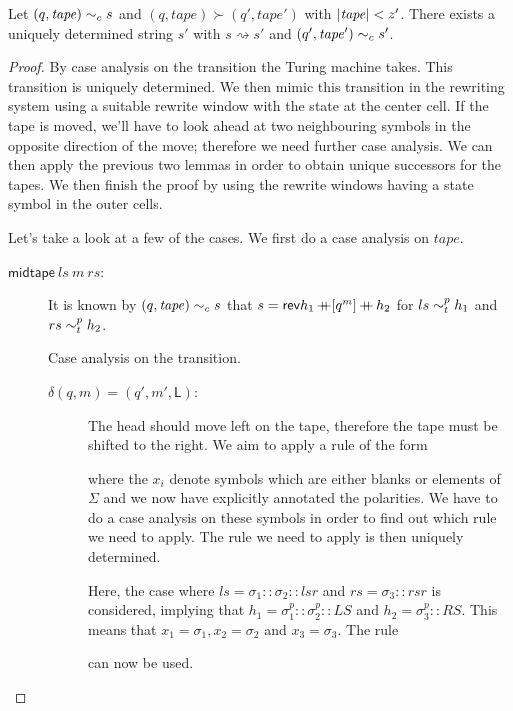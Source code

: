 \documentclass[a4paper,UKenglish,cleveref, autoref]{lipics-v2019}
\newcommand{\strent}{\rightsquigarrow}
\begin{document}
\begin{lemma}
  Let $(q, \mathit{tape}) \sim_c{} s$ and $(q, \mathit{tape}) \succ (q', \mathit{tape}')$ with $|\mathit{tape}| < z'$. There exists a uniquely determined string $s'$ with $s \strent{} s'$ and $(q', \mathit{tape}') \sim_c{} s'$. 
\end{lemma}
\begin{proof}
  By case analysis on the transition the Turing machine takes. This transition is uniquely determined. We then mimic this transition in the rewriting system using a suitable rewrite window with the state at the center cell. If the tape is moved, we'll have to look ahead at two neighbouring symbols in the opposite direction of the move; therefore we need further case analysis. We can then apply the previous two lemmas in order to obtain unique successors for the tapes. 
  We then finish the proof by using the rewrite windows having a state symbol in the outer cells. 

  Let's take a look at a few of the cases.
  We first do a case analysis on $\mathit{tape}$.
  \begin{description}
    \item[$\textsf{midtape}~ls~m~rs$:]
      It is known by $(q, \mathit{tape}) \sim_c{} s$ that $s = \mathsf{rev}{h_1} \mathop{{+}\!\!\!{+}} [q^m] \mathop{{+}\!\!\!{+}} h_2$ for $ls \sim_t^{p} h_1$ and $rs \sim_t^{p} h_2$.

      Case analysis on the transition.
      \begin{description}
        \item[$\delta(q, m) = (q', m', \textsf{L})$:]
          The head should move left on the tape, therefore the tape must be shifted to the right. We aim to apply a rule of the form
          \begin{center}
          \end{center}
          where the $x_i$ denote symbols which are either blanks or elements of $\Sigma$ and we now have explicitly annotated the polarities. We have to do a case analysis on these symbols in order to find out which rule we need to apply. 
          The rule we need to apply is then uniquely determined. 

          Here, the case where $ls = \sigma_1 :: \sigma_2 :: lsr$ and $rs = \sigma_3 :: rsr$ is considered, implying that $h_1 = \sigma_1^p :: \sigma_2^p :: LS$ and $h_2 = \sigma_3^p :: RS$. 
          This means that $x_1 = \sigma_1, x_2 = \sigma_2$ and $x_3 = \sigma_3$. The rule 
          \begin{center}
          \end{center}
          can now be used.


\end{description}
\end{description}
\end{proof}
\end{document}
